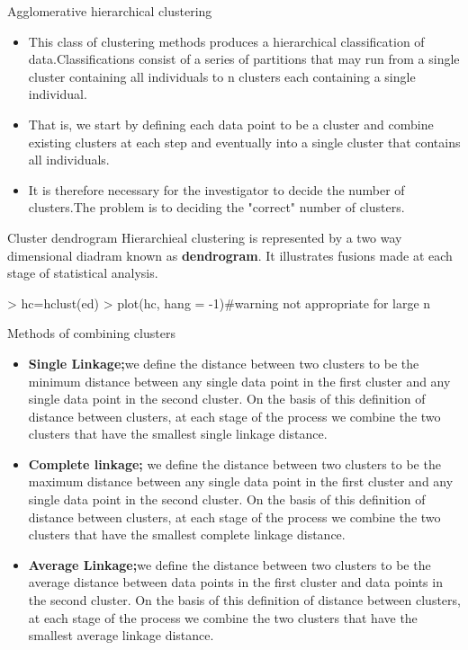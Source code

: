 \documentclass[10pt]{beamer}
\begin{document}
\begin{frame}[fragile]{Agglomerative hierarchical clustering}
\begin{block}{}
\begin{itemize}
\item This class of clustering methods produces a hierarchical classification of data.Classifications consist of a series of partitions that may run from a single cluster containing all individuals to n clusters each containing a single individual.
\item That is, we start by defining each data point to be a cluster and combine existing clusters at each step and eventually into a single cluster that contains all individuals.
\item It is therefore necessary for the investigator to decide the number of clusters.The problem is to deciding the "correct" number of clusters.
\end{itemize}
\end{block}

\begin{block}{Cluster dendrogram}
Hierarchieal clustering is represented by a two way dimensional diadram known as \textbf{dendrogram}. It illustrates fusions made at each stage of statistical analysis.
\begin{Schunk}
\begin{Sinput}
> hc=hclust(ed)
> plot(hc, hang = -1)#warning not appropriate for large n
\end{Sinput}
\end{Schunk}
\end{block}
\end{frame}


\begin{frame}
\begin{block}{Methods of combining clusters}
\begin{itemize}
\item \textbf{Single Linkage;}we define the distance between two clusters to be the minimum distance between any single data point in the first cluster and any single data point in the second cluster. On the basis of this definition of distance between clusters, at each stage of the process we combine the two clusters that have the smallest single linkage distance.
\item \textbf{Complete linkage;} we define the distance between two clusters to be the maximum distance between any single data point in the first cluster and any single data point in the second cluster. On the basis of this definition of distance between clusters, at each stage of the process we combine the two clusters that have the smallest complete linkage distance.
\item \textbf{Average Linkage;}we define the distance between two clusters to be the average distance between data points in the first cluster and data points in the second cluster. On the basis of this definition of distance between clusters, at each stage of the process we combine the two clusters that have the smallest average linkage distance.
\end{itemize}
\end{block}
\end{frame}
\end{document}
